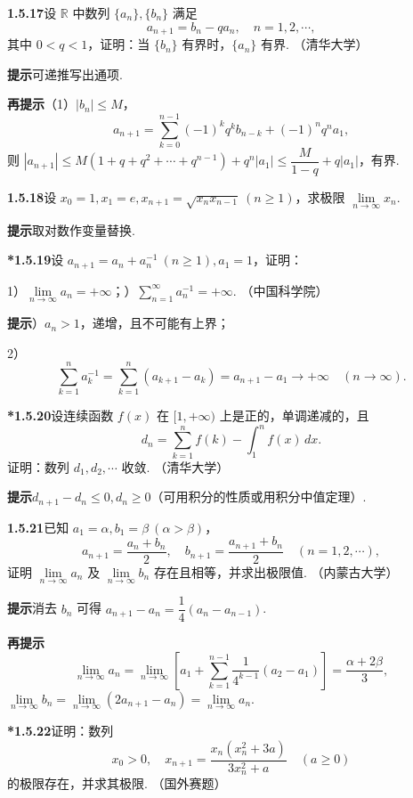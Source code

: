 \documentclass[UTF8, 12pt, fontset=fandol, oneside]{ctexart}
\begin{document}
\noindent\textbf{1.5.17}\quad 设 $\mathbb{R}$ 中数列 $\{a_n\},\{b_n\}$ 满足
\[
  a_{n+1}=b_n-qa_n,\quad n=1,2,\cdots,
\]
其中 $0<q<1$，证明：当 $\{b_n\}$ 有界时，$\{a_n\}$ 有界. （清华大学）

\noindent\textbf{提示}\quad 可递推写出通项.

\noindent\textbf{再提示}\quad （1）$|b_n|\le M$，
\[
  a_{n+1}=\sum_{k=0}^{n-1}(-1)^kq^kb_{n-k}+(-1)^nq^na_1,
\]
则 $|a_{n+1}|\le M(1+q+q^2+\cdots+q^{n-1})+q^n|a_1|\le \dfrac{M}{1-q}+q|a_1|$，有界.

\noindent\textbf{1.5.18}\quad 设 $x_0=1,x_1=e,x_{n+1}=\sqrt{x_nx_{n-1}}\ (n\ge 1)$，求极限 $\lim\limits_{n\to\infty}x_n$.

\noindent\textbf{提示}\quad 取对数作变量替换.

\noindent\textbf{*1.5.19}\quad 设 $a_{n+1}=a_n+a_n^{-1}\ (n\ge 1),a_1=1$，证明：

1）$\lim\limits_{n\to\infty}a_n=+\infty$；）$\sum\limits_{n=1}^{\infty}a_n^{-1}=+\infty$. （中国科学院）

\noindent\textbf{提示}）$a_n>1$，递增，且不可能有上界；

2）
\[
  \sum_{k=1}^n a_k^{-1}=\sum_{k=1}^n(a_{k+1}-a_k)=a_{n+1}-a_1\to +\infty\quad (n\to\infty).
\]

\noindent\textbf{*1.5.20}\quad 设连续函数 $f(x)$ 在 $[1,+\infty)$ 上是正的，单调递减的，且
\[
  d_n=\sum_{k=1}^n f(k)-\int_1^n f(x)\,dx.
\]
证明：数列 $d_1,d_2,\cdots$ 收敛. （清华大学）

\noindent\textbf{提示}\quad $d_{n+1}-d_n\le 0,d_n\ge 0$（可用积分的性质或用积分中值定理）.

\noindent\textbf{1.5.21}\quad 已知 $a_1=\alpha,b_1=\beta\ (\alpha>\beta)$，
\[
  a_{n+1}=\frac{a_n+b_n}{2},\quad
  b_{n+1}=\frac{a_{n+1}+b_n}{2}\quad (n=1,2,\cdots),
\]
证明 $\lim\limits_{n\to\infty}a_n$ 及 $\lim\limits_{n\to\infty}b_n$ 存在且相等，并求出极限值. （内蒙古大学）

\noindent\textbf{提示}\quad 消去 $b_n$ 可得 $a_{n+1}-a_n=\dfrac14(a_n-a_{n-1})$.

\noindent\textbf{再提示}\quad
\[
  \lim_{n\to\infty}a_n=\lim_{n\to\infty}\left[a_1+\sum_{k=1}^{n-1}\frac1{4^{k-1}}(a_2-a_1)\right]=\frac{\alpha+2\beta}{3},
\]
$\lim\limits_{n\to\infty}b_n=\lim\limits_{n\to\infty}(2a_{n+1}-a_n)=\lim\limits_{n\to\infty}a_n$.

\noindent\textbf{*1.5.22}\quad 证明：数列
\[
  x_0>0,\quad x_{n+1}=\frac{x_n(x_n^2+3a)}{3x_n^2+a}\quad (a\ge 0)
\]
的极限存在，并求其极限. （国外赛题）
\end{document}
